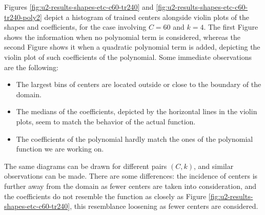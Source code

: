 \documentclass[12pt]{report} %
\begin{document}



Figures \ref{fig:u2-results-shapes-etc-c60-tr240} and \ref{fig:u2-results-shapes-etc-c60-tr240-poly2} depict a histogram of trained centers alongside violin plots of the shapes and coefficients, for the case involving $C=60$ and $k=4$. The first Figure shows the information when no polynomial term is considered, whereas the second Figure shows it when a quadratic polynomial term is added, depicting the violin plot of such coefficients of the polynomial. Some immediate observations are the following: \begin{itemize}
  \item The largest bins of centers are located outside or close to the boundary of the domain.
  \item The medians of the coefficients, depicted by the horizontal lines in the violin plots, seem to match the behavior of the actual function.
  \item The coefficients of the polynomial hardly match the ones of the polynomial function we are working on.
\end{itemize}

The same diagrams can be drawn for different pairs $(C,k)$, and similar observations can be made. There are some differences: the incidence of centers is further away from the domain as fewer centers are taken into consideration, and the coefficients do not resemble the function as closely as Figure \ref{fig:u2-results-shapes-etc-c60-tr240}, this resemblance loosening as fewer centers are considered.
\end{document}
